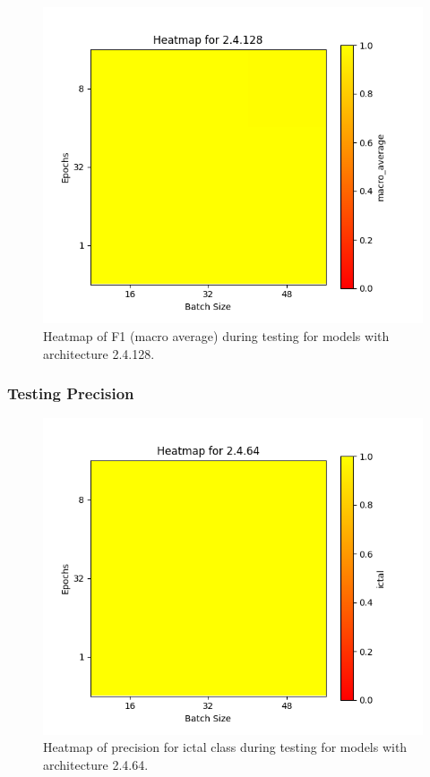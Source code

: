 \documentclass[12pt]{article}
\begin{document}
\begin{figure}[H]
\includegraphics[width=\textwidth]{heatmap_f1_macro_average_2.4.128}
\centering
\caption{Heatmap of F1 (macro average) during testing for models with architecture 2.4.128.}
\label{fig:time-metrics}
\end{figure}



\subsubsection{Testing Precision}




\begin{figure}[H]
\includegraphics[width=\textwidth]{heatmap_precision_ictal_2.4.64}
\centering
\caption{Heatmap of precision for ictal class during testing for models with architecture 2.4.64.}
\label{fig:time-metrics}
\end{figure}
\end{document}
